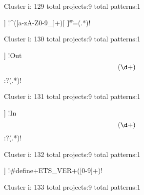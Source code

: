 Cluster i: 129
total projects:9
total patterns:1
\begin{multicols}{1}
\begin{description}[noitemsep,topsep=0pt]
\item [[9] ] \cverb!^([a-zA-Z0-9_]+)[ \t]*=(.*)!
\end{description}
\end{multicols}







Cluster i: 130
total projects:9
total patterns:1
\begin{multicols}{1}
\begin{description}[noitemsep,topsep=0pt]
\item [[9] ] \cverb!Out\[(\d+)\]:\s?(.*)\s*!
\end{description}
\end{multicols}







Cluster i: 131
total projects:9
total patterns:1
\begin{multicols}{1}
\begin{description}[noitemsep,topsep=0pt]
\item [[9] ] \cverb!In \[(\d+)\]:\s?(.*)\s*!
\end{description}
\end{multicols}







Cluster i: 132
total projects:9
total patterns:1
\begin{multicols}{1}
\begin{description}[noitemsep,topsep=0pt]
\item [[9] ] \cverb!#define\s+ETS_VER\s+([0-9]+)!
\end{description}
\end{multicols}







Cluster i: 133
total projects:9
total patterns:1
\begin{multicols}{1}
\end{multicols}







